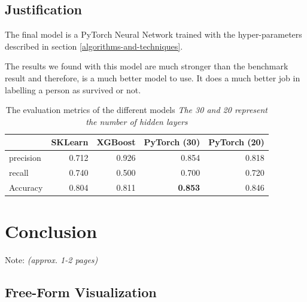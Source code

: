 \documentclass{article}
\begin{document}
\subsection{Justification}\label{justification}

The final model is a PyTorch Neural Network trained with the
hyper-parameters described in section \ref{algorithms-and-techniques}.

The results we found with this model are much stronger than the benchmark
result and therefore, is a much better model to use. It does a much better
job in labelling a person as survived or not.

\begin{center}
    \begin{table}[h]
        \begin{tabular}{lrrrr}
            \hline
            {} &     SKLearn &     XGBoost  &         PyTorch (30) &  PyTorch (20) \\
            \hline
            precision &     0.712 &     0.926 &     0.854 &     0.818  \\
            recall    &     0.740 &     0.500 &     0.700 &     0.720  \\
            \hline
            Accuracy  &     0.804 &     0.811 &   \textbf{0.853} &    0.846  \\
            \hline
        \end{tabular}
        \caption{\label{tab:data-results}The evaluation metrics of the different models 
            \emph{The 30 and 20 represent the number of hidden layers}}
    \end{table}
\end{center}

\section{Conclusion}\label{conclusion}

Note: \emph{(approx. 1-2 pages)}


\subsection{Free-Form Visualization}\label{free-form-visualization}
\end{document}

